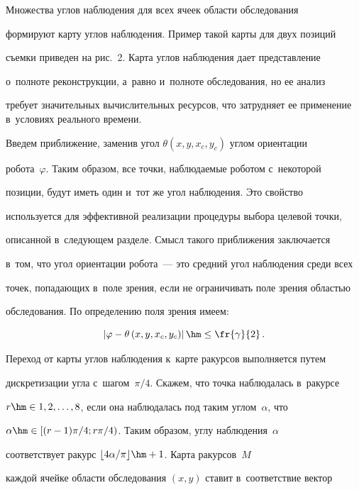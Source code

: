  

  Множества углов наблюдения для всех ячеек области обследования 

формируют карту углов наблюдения. Пример такой карты для двух позиций 

съемки приведен на рис.~2. Карта углов наблюдения дает представление 

о~полноте реконструкции, а~равно и~полноте обследования, но ее анализ 

требует значительных вы\-чис\-ли\-тель\-ных ресурсов, что затрудняет ее применение в~условиях реального времени.

  





  Введем приближение, заменив угол $\theta(x,y,x_c, y_c)$ углом ориентации 

робота~$\varphi$. Таким образом, все точки, наблюдаемые роботом с~некоторой 

позиции, будут иметь один и~тот же угол наблюдения. Это свойство 

используется для эффективной реализации процедуры выбора целевой точки, 

описанной в~следующем разделе. Смысл такого приближения заключается 

в~том, что угол ориентации робота~--- это средний угол наблюдения среди всех 

точек, попадающих в~поле зрения, если не ограничивать поле зрения областью 

обследования. По определению поля зрения имеем: 

$$

\left\vert \varphi  - 

\theta\left(x,y,x_c,y_c\right)\right\vert \hm\leq \fr{\gamma}{2}\,.

$$

  

  Переход от карты углов наблюдения к~карте ракурсов выполняется путем 

дискретизации угла с~шагом~$\pi/4$. Скажем, что точка наблюдалась в~ракурсе 

$r\hm\in 1, 2, \ldots , 8$, если она наблюдалась под таким углом~$\alpha$, что 

$\alpha\hm\in [ (r-1)\pi/4; r\pi/4 )$. Таким образом, углу наблюдения~$\alpha$ 

соответствует ракурс $\lfloor 4\alpha/\pi\rfloor\hm+1$. Карта ракурсов~$M$ 

каждой ячейке области обследования $(x,y)$ ставит в~соответствие вектор 

